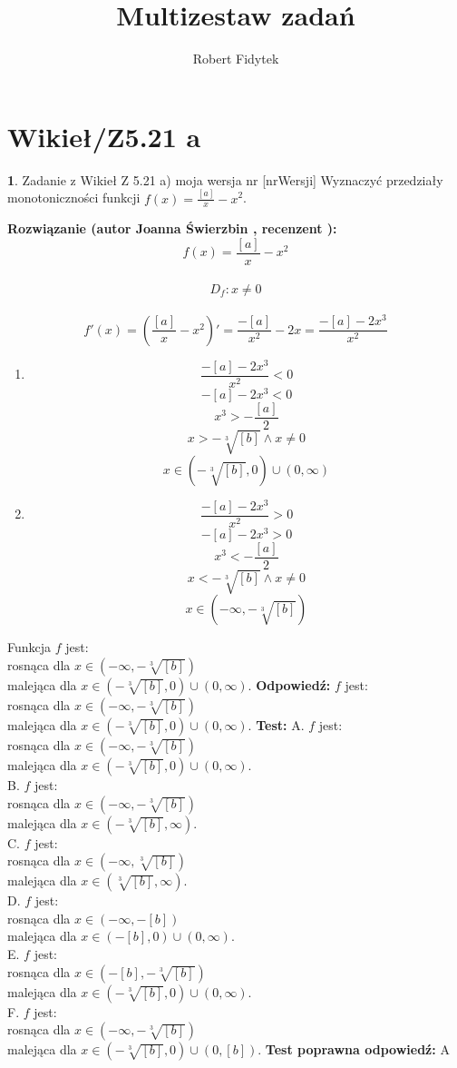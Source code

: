 \documentclass[12pt, a4paper]{article}
\title{Multizestaw zadań}
\author{Robert Fidytek}
\date{}
\theoremstyle{definition} %
\newtheorem{zad}{}
\newcommand{\kategoria}[1]{\section{#1}} %
\newcommand{\zadStart}[1]{\begin{zad}#1\newline} %
\newcommand{\zadStop}{\end{zad}}   %
\newcommand{\rozwStart}[2]{\noindent \textbf{Rozwiązanie (autor #1 , recenzent #2): }\newline} %
\newcommand{\rozwStop}{\newline}                                            %
\newcommand{\odpStart}{\noindent \textbf{Odpowiedź:}\newline}    %
\newcommand{\odpStop}{\newline}                                             %
\newcommand{\testStart}{\noindent \textbf{Test:}\newline} %
\newcommand{\testStop}{\newline} %
\newcommand{\kluczStart}{\noindent \textbf{Test poprawna odpowiedź:}\newline} %
\newcommand{\kluczStop}{\newline} %
\begin{document}
\maketitle


\kategoria{Wikieł/Z5.21 a}
\zadStart{Zadanie z Wikieł Z 5.21 a) moja wersja nr [nrWersji]}
Wyznaczyć przedziały monotoniczności funkcji $f(x)=\frac{[a]}{x}-x^2$.
\zadStop
\rozwStart{Joanna Świerzbin}{}
$$f(x)=\frac{[a]}{x}-x^2$$
\\
$$D_f:x \neq 0 $$
\\
$$f'(x)=\left(\frac{[a]}{x}-x^2\right)' = \frac{-[a]}{x^2} -2x = \frac{-[a]-2x^3}{x^2}$$
\begin{enumerate}
\item 
$$\frac{-[a]-2x^3}{x^2}<0$$
$$-[a]-2x^3<0$$
$$x^3>-\frac{[a]}{2}$$
$$x>-\sqrt[3]{[b]} \land x\neq 0$$ 
$$ x \in ( -\sqrt[3]{[b]},0) \cup (0, \infty) $$
\item 
$$\frac{-[a]-2x^3}{x^2}>0$$
$$-[a]-2x^3>0$$
$$x^3<-\frac{[a]}{2}$$
$$x<-\sqrt[3]{[b]} \land x\neq 0$$ 
$$ x \in (-\infty , -\sqrt[3]{[b]})  $$
\end{enumerate}
Funkcja $f$ jest: \\ rosnąca dla $x \in \left(-\infty , -\sqrt[3]{[b]}\right)$ \\ malejąca dla $x \in \left( -\sqrt[3]{[b]},0\right) \cup \left(0, \infty \right)$.
\rozwStop
\odpStart
$f$ jest: \\ rosnąca dla $x \in \left(-\infty , -\sqrt[3]{[b]}\right)$ \\ malejąca dla $x \in \left( -\sqrt[3]{[b]},0\right) \cup \left(0, \infty \right)$.
\odpStop
\testStart
A. $f$ jest: \\ rosnąca dla $x \in \left(-\infty , -\sqrt[3]{[b]}\right)$ \\ malejąca dla $x \in \left( -\sqrt[3]{[b]},0\right) \cup \left(0, \infty \right)$.\\
B. $f$ jest: \\ rosnąca dla $x \in \left(-\infty , -\sqrt[3]{[b]}\right)$ \\ malejąca dla $x \in \left( -\sqrt[3]{[b]},\infty \right)$.\\
C. $f$ jest: \\ rosnąca dla $x \in \left(-\infty , \sqrt[3]{[b]}\right)$ \\ malejąca dla $x \in \left( \sqrt[3]{[b]},\infty \right)$.\\
D. $f$ jest: \\ rosnąca dla $x \in \left(-\infty , -[b] \right)$ \\ malejąca dla $x \in \left( -[b],0\right) \cup \left(0, \infty \right)$.\\
E. $f$ jest: \\ rosnąca dla $x \in \left(-[b], -\sqrt[3]{[b]}\right)$ \\ malejąca dla $x \in \left( -\sqrt[3]{[b]},0\right) \cup \left(0, \infty \right)$.\\
F. $f$ jest: \\ rosnąca dla $x \in \left(-\infty , -\sqrt[3]{[b]}\right)$ \\ malejąca dla $x \in \left( -\sqrt[3]{[b]},0\right) \cup \left(0, [b] \right)$.
\testStop
\kluczStart
A
\kluczStop
\end{document}
